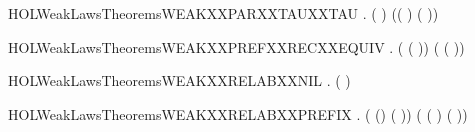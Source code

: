 \newcommand{\HOLWeakLawsTheoremsWEAKXXPARXXTAUXXPREF}{\UseVerbatim{HOLWeakLawsTheoremsWEAKXXPARXXTAUXXPREF}}
\begin{SaveVerbatim}{HOLWeakLawsTheoremsWEAKXXPARXXTAUXXTAU}
\HOLTokenTurnstile{} \HOLSymConst{\HOLTokenForall{}} .
        (\HOLConst{\ensuremath{\tau}} \HOLSymConst{\ensuremath{\parallel}} \HOLConst{\ensuremath{\tau}})
         (\HOLConst{\ensuremath{\tau}}( \HOLSymConst{\ensuremath{\parallel}} \HOLConst{\ensuremath{\tau}}) \HOLSymConst{\ensuremath{+}} \HOLConst{\ensuremath{\tau}}(\HOLConst{\ensuremath{\tau}} \HOLSymConst{\ensuremath{\parallel}} ))
\end{SaveVerbatim}
\newcommand{\HOLWeakLawsTheoremsWEAKXXPARXXTAUXXTAU}{\UseVerbatim{HOLWeakLawsTheoremsWEAKXXPARXXTAUXXTAU}}
\begin{SaveVerbatim}{HOLWeakLawsTheoremsWEAKXXPREFXXRECXXEQUIV}
\HOLTokenTurnstile{} \HOLSymConst{\HOLTokenForall{}}  .
        (  ( )) (  ( ))
\end{SaveVerbatim}
\newcommand{\HOLWeakLawsTheoremsWEAKXXPREFXXRECXXEQUIV}{\UseVerbatim{HOLWeakLawsTheoremsWEAKXXPREFXXRECXXEQUIV}}
\begin{SaveVerbatim}{HOLWeakLawsTheoremsWEAKXXRELABXXNIL}
\HOLTokenTurnstile{} \HOLSymConst{\HOLTokenForall{}}.  (  ) 
\end{SaveVerbatim}
\newcommand{\HOLWeakLawsTheoremsWEAKXXRELABXXNIL}{\UseVerbatim{HOLWeakLawsTheoremsWEAKXXRELABXXNIL}}
\begin{SaveVerbatim}{HOLWeakLawsTheoremsWEAKXXRELABXXPREFIX}
\HOLTokenTurnstile{} \HOLSymConst{\HOLTokenForall{}}  .
        ( () ( ))
         ( ( )   ( ))
\end{SaveVerbatim}
